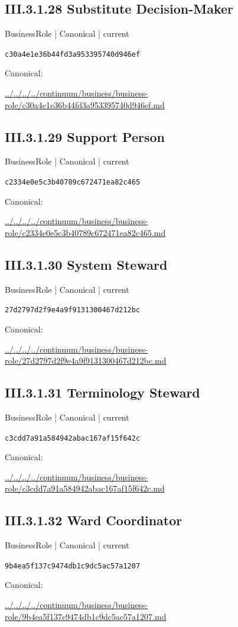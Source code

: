 \documentclass[10pt,a4paper]{article}
\begin{document}
\subsection*{III.3.1.28 Substitute Decision-Maker}
{\small BusinessRole | Canonical | current}\par
\texttt{c30a4e1e36b44fd3a953395740d946ef}\par
Canonical: \par
{\footnotesize\url{../../../../continuum/business/business-role/c30a4e1e36b44fd3a953395740d946ef.md}}\par
\subsection*{III.3.1.29 Support Person}
{\small BusinessRole | Canonical | current}\par
\texttt{c2334e0e5c3b40789c672471ea82c465}\par
Canonical: \par
{\footnotesize\url{../../../../continuum/business/business-role/c2334e0e5c3b40789c672471ea82c465.md}}\par
\subsection*{III.3.1.30 System Steward}
{\small BusinessRole | Canonical | current}\par
\texttt{27d2797d2f9e4a9f9131300467d212bc}\par
Canonical: \par
{\footnotesize\url{../../../../continuum/business/business-role/27d2797d2f9e4a9f9131300467d212bc.md}}\par
\subsection*{III.3.1.31 Terminology Steward}
{\small BusinessRole | Canonical | current}\par
\texttt{c3cdd7a91a584942abac167af15f642c}\par
Canonical: \par
{\footnotesize\url{../../../../continuum/business/business-role/c3cdd7a91a584942abac167af15f642c.md}}\par
\subsection*{III.3.1.32 Ward Coordinator}
{\small BusinessRole | Canonical | current}\par
\texttt{9b4ea5f137c9474db1c9dc5ac57a1207}\par
Canonical: \par
{\footnotesize\url{../../../../continuum/business/business-role/9b4ea5f137c9474db1c9dc5ac57a1207.md}}\par
\end{document}
